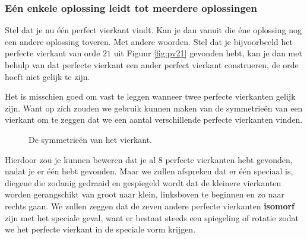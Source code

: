 \subsubsection{E\'en enkele oplossing leidt tot meerdere oplossingen}

Stel dat je nu \'e\'en perfect vierkant vindt. Kan je dan vanuit die \'ene oplossing nog een andere oplossing toveren. Met andere woorden. Stel dat je bijvoorbeeld het perfecte vierkant van orde $21$ uit Figuur \ref{fig:pv21} gevonden hebt, kan je dan met behulp van dat perfecte vierkant een ander perfect vierkant construeren, de orde hoeft niet gelijk te zijn.

Het is misschien goed om vast te leggen wanneer twee perfecte vierkanten gelijk zijn. Want op zich zouden we gebruik kunnen maken van de symmetrie\"en van een vierkant om te zeggen dat we een aantal verschillende perfecte vierkanten vinden.


\begin{figure}[ht]
  \centering
  



  \caption{De symmetrie\"en van het vierkant.}
  \label{fig:symmetrie_vierkant}
\end{figure}


\clearpage

Hierdoor zou je kunnen beweren dat je al $8$ perfecte vierkanten hebt gevonden, nadat je er \'e\'en hebt gevonden. Maar we zullen afspreken dat er \'e\'en speciaal is, diegene die zodanig gedraaid en gespiegeld wordt dat de kleinere vierkanten worden gerangschikt van groot naar klein, linksboven te beginnen en zo naar rechts gaan. We zullen zeggen dat de zeven andere perfecte vierkanten {\bf isomorf} zijn met het speciale geval, want er bestaat steeds een spiegeling of rotatie zodat we het perfecte vierkant in de speciale vorm krijgen.


